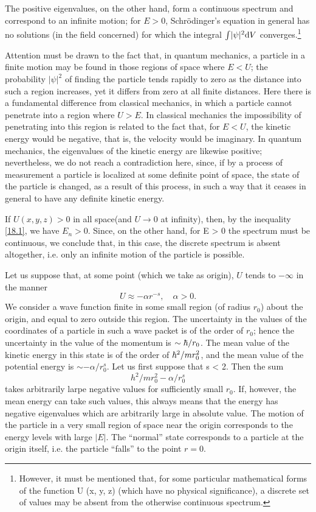 The positive eigenvalues, on the other hand, form a continuous spectrum and correspond to an infinite motion; for $ E > 0 $, Schrödinger’s equation in general has no solutions (in the field concerned) for which the integral $ \int\lvert\psi\rvert^2\mathrm{d} V $ converges.\footnote{However, it must be mentioned that, for some particular mathematical forms of the function U (x, y, z) (which have no physical significance), a discrete set of values may be absent from the otherwise continuous spectrum.}

Attention must be drawn to the fact that, in quantum mechanics, a particle in a finite motion may be found in those regions of space where $ E < U $; the probability $ \lvert\psi\rvert^2 $ of finding the particle tends rapidly to zero as the distance into such a region increases, yet it differs from zero at all finite distances. Here there is a fundamental difference from classical mechanics, in which a particle cannot penetrate into a region where $ U>E $. In classical mechanics the impossibility of penetrating into this region is related to the fact that, for $ E < U $, the kinetic energy would be negative, that is, the velocity would be imaginary. In quantum mechanics, the eigenvalues of the kinetic energy are likewise positive; nevertheless, we do not reach a contradiction here, since, if by a process of measurement a particle is localized at some definite point of space, the state of the particle is changed, as a result of this process, in such a way that it ceases in general to have any definite kinetic energy.

If $ U(x, y, z)>0 $ in all space(and $ U\to0 $ at infinity), then, by the inequality \eqref{18.1}, we have $ E_n>0 $. Since, on the other hand, for E > 0 the spectrum must be continuous, we conclude that, in this case, the discrete spectrum is absent altogether, i.e. only an infinite motion of the particle is possible.

Let us suppose that, at some point (which we take as origin), $ U $ tends to $ -\infty $ in the manner
\begin{equation}\label{18.2}
U\approx-\alpha r^{-s},\quad\alpha>0.
\end{equation}
We consider a wave function finite in some small region (of radius $ r_0 $) about the origin, and equal to zero outside this region. The uncertainty in the values of the coordinates of a particle in such a wave packet is of the order of $ r_0 $; hence the uncertainty in the value of the momentum is $ \sim\hbar/r_0 $. The mean value of the kinetic energy in this state is of the order of $ \hbar^2/mr^2_0 $, and the mean value of the potential energy is $ \sim-\alpha/r^s_0 $. Let us first suppose that s < 2. Then the sum
\[ h^2/mr^2_0-\alpha/r^s_0 \]
takes arbitrarily larpe negative values for sufficiently small $ r_0 $. If, however, the mean energy can take such values, this always means that the energy has negative eigenvalues which are arbitrarily large in absolute value. The motion of the particle in a very small region of space near the origin corresponds to the energy levels with large $ \lvert E\rvert $. The “normal” state corresponds to a particle at the origin itself, i.e. the particle “falls” to the point $ r = 0 $.

